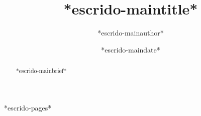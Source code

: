\documentclass[11pt]{report}
\begin{document}

\title{*escrido-maintitle*}
\author{*escrido-mainauthor*}
\date{*escrido-maindate*}
\maketitle


\begin{abstract}
*escrido-mainbrief*
\end{abstract}


\newpage
\tableofcontents
\newpage

*escrido-pages*
\end{document}
